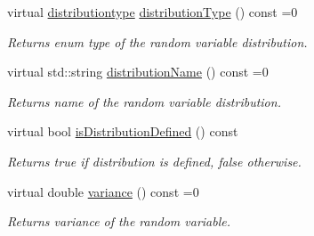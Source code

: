\begin{DoxyCompactItemize}
virtual \hyperlink{class_c_random_variable_a80d2a87c43847274138b51f7d713d7f1}{distributiontype} \hyperlink{class_c_random_variable_a3b30589d41f4dd200bd40c8273cac2cd}{distribution\-Type} () const =0
\begin{DoxyCompactList}\small\item\em Returns enum type of the random variable distribution. \end{DoxyCompactList}\item 
virtual std\-::string \hyperlink{class_c_random_variable_a4b33eef7c56f9f1a83af01fa8ef2502b}{distribution\-Name} () const =0
\begin{DoxyCompactList}\small\item\em Returns name of the random variable distribution. \end{DoxyCompactList}\item 
virtual bool \hyperlink{class_c_random_variable_a60e88c15450ab21dea6bef00d8836da7}{is\-Distribution\-Defined} () const 
\begin{DoxyCompactList}\small\item\em Returns true if distribution is defined, false otherwise. \end{DoxyCompactList}\item 
virtual double \hyperlink{class_c_random_variable_a3b0b87c4aab74c0406cd8321b8b96747}{variance} () const =0
\begin{DoxyCompactList}\small\item\em Returns variance of the random variable. \end{DoxyCompactList}\end{DoxyCompactItemize}
